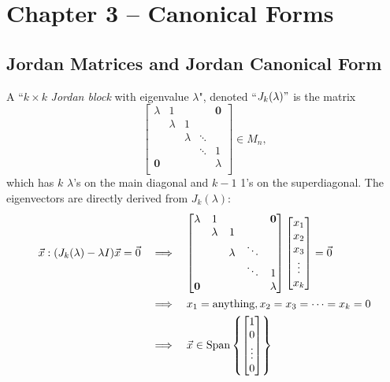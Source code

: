 \section{Chapter 3 -- Canonical Forms}
\subsection{Jordan Matrices and Jordan Canonical Form}

\begin{definition}
\label{def:jordan-block}
A ``$k \times k$ \textit{Jordan block} with eigenvalue $\lambda$", denoted ``$J_k(\lambda)"$ is the matrix
$$
\begin{bmatrix}
\lambda & 1 & & & \mathbf{0} \\
  & \lambda & 1 & &   \\
  & & \lambda & \ddots &\\
  & & & \ddots & 1 \\
\mathbf{0} & & & & \lambda \\
\end{bmatrix} \in M_n,
$$
which has $k$ $\lambda$'s on the main diagonal and $k-1$ 1's on the superdiagonal. The eigenvectors are directly derived from $J_k(\lambda)$:
\begin{align*}
    \Vec{x} : (J_k(\lambda) - \lambda I) \Vec{x} = \Vec{0} 
        &\quad \Longrightarrow \quad
            \begin{bmatrix}
                \lambda & 1 & & & \mathbf{0} \\
                & \lambda & 1 & &   \\
                & & \lambda & \ddots &\\
                & & & \ddots & 1 \\
                \mathbf{0} & & & & \lambda \\
            \end{bmatrix}
            \begin{bmatrix}
            x_1 \\ x_2 \\ x_3 \\ \vdots \\ x_k
            \end{bmatrix} = \Vec{0} \\
        &\quad \Longrightarrow \quad x_1 = \text{anything}, x_2 = x_3 = \dots = x_k = 0 \\
        &\quad \Longrightarrow \quad \Vec{x} \in \operatorname{Span}\left\{\begin{bmatrix} 1 \\ 0 \\ \vdots \\ 0\end{bmatrix}\right\}
\end{align*}
\end{definition}

